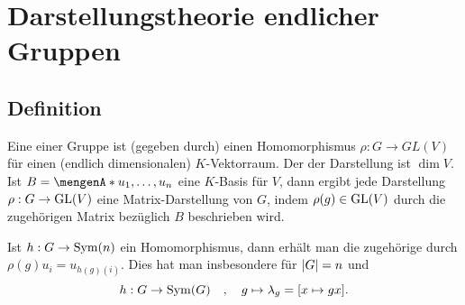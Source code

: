 \section{Darstellungstheorie endlicher Gruppen} %
\label{sec:4}

\subsection[Definition: Darstellung einer Gruppe]{Definition} %
\label{sub:41}
Eine  einer Gruppe ist (gegeben durch) einen Homomorphismus $\rho : G \to GL(V)$ für einen (endlich dimensionalen) $K$-Vektorraum. Der  der 
Darstellung ist $\dim V$. Ist $B = \set{u_1, \ldots , u_n}$ eine $K$-Basis für $V$, dann ergibt jede Darstellung $\rho : G \to \GL(V)$ eine Matrix-Darstellung von $G$,
indem $\rho(g) \in \GL(V)$ durch die zugehörigen Matrix bezüglich $B$ beschrieben wird. 

Ist $h : G \to \Sym(n)$ ein Homomorphismus, dann erhält man die zugehörige
 durch $\rho(g) u_i = u_{h(g)(i)}$. Dies hat man insbesondere für $\abs*{G}=n$ und 
\[
	h : G \to \Sym(G) \quad , \quad  g \mapsto \lambda_g = [x \mapsto g x].
\]

